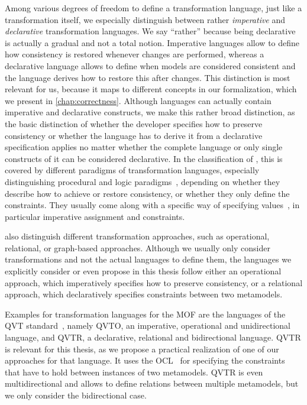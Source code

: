 Among various degrees of freedom to define a transformation language, just like a transformation itself, we especially distinguish between rather \emph{imperative} and \emph{declarative} transformation languages.
We say \enquote{rather} because being declarative is actually a gradual and not a total notion.
Imperative languages allow to define how consistency is restored whenever changes are performed, whereas a declarative language allows to define when models are considered consistent and the language derives how to restore this after changes.
This distinction is most relevant for us, because it maps to different concepts in our formalization, which we present in \autoref{chap:correctness}.
Although languages can actually contain imperative and declarative constructs, we make this rather broad distinction, as the basic distinction of whether the developer specifies how to preserve consistency or whether the language has to derive it from a declarative specification applies no matter whether the complete language or only single constructs of it can be considered declarative.
In the classification of \textcite{czarnecki2006a}, this is covered by different paradigms of transformation languages, especially distinguishing procedural and logic paradigms~\cite[Fig.~20]{czarnecki2006a}, depending on whether they describe how to achieve or restore consistency, or whether they only define the constraints.
They usually come along with a specific way of specifying values~\cite[Fig.~20]{czarnecki2006a}, in particular imperative assignment and constraints.

\textcite{czarnecki2006a} also distinguish different transformation approaches, such as operational, relational, or graph-based approaches.
Although we usually only consider transformations and not the actual languages to define them, the languages we explicitly consider or even propose in this thesis follow either an operational approach, which imperatively specifies how to preserve consistency, or a relational approach, which declaratively specifies constraints between two metamodels.

Examples for transformation languages for the \gls{MOF} are the languages of the \gls{QVT} standard~\cite{qvt}, namely \gls{QVTO}, an imperative, operational and unidirectional language, and \gls{QVTR}, a declarative, relational and bidirectional language.
\gls{QVTR} is relevant for this thesis, as we propose a practical realization of one of our approaches for that language.
It uses the \gls{OCL}~\cite{ocl} for specifying the constraints that have to hold between instances of two metamodels.
\gls{QVTR} is even multidirectional and allows to define relations between multiple metamodels, but we only consider the bidirectional case.

